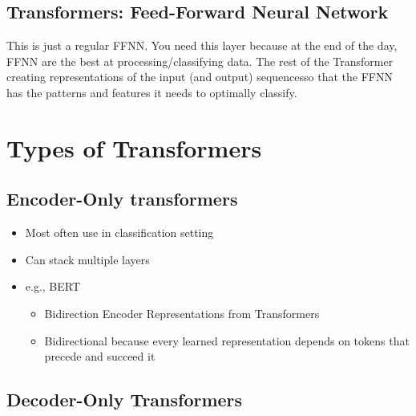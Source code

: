 \documentclass[12pt]{article}
\begin{document}
\subsection{Transformers: Feed-Forward Neural Network}

This is just a regular FFNN. You need this layer because at the end of the day, FFNN are the best at processing/classifying data. The rest of the Transformer creating representations of the input (and output) sequencesso that the FFNN has the patterns and features it needs to optimally classify. 

\section{Types of Transformers}

\subsection{Encoder-Only transformers}

\begin{itemize}
	\item Most often use in classification setting
	\item Can stack multiple layers
	\item e.g., BERT
		\begin{itemize}
			\item Bidirection Encoder Representations from Transformers
			\item Bidirectional because every learned representation depends on tokens that precede and succeed it
		\end{itemize}
\end{itemize}

\subsection{Decoder-Only Transformers}
\end{document}
